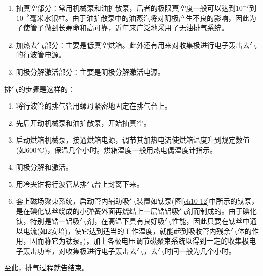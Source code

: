 \begin{enumerate}[(1)]
	\item 抽真空部分：常用机械泵和油扩散泵，后者的极限真空度一般可以达到$ 10^{-7} $到$ 10^{-8} $毫米水银柱。由于油扩散泵中的油蒸汽将对阴极产生不良的影响，因此为了使管子做到长寿命和高可靠，近年来广泛地采用了无油排气系统。
	\item 加热去气部分：主要是低真空烘箱。此外还有用来对收集极进行电子轰击去气的行波管电源。
	\item 阴极分解激活部分：主要是阴极分解激活电源。
\end{enumerate}

排气的步骤是这样的：

\begin{enumerate}
	\item 将行波管的排气管用螺母紧密地固定在排气台上。
	\item 先后开动机械泵和油扩散泵，开始抽真空。
	\item 启动烘箱机械泵，接通烘箱电源，调节其加热电流使烘箱温度升到规定数值(如600\si{\degreeCelsius})，保温几个小时。烘箱温度一般用热电偶温度计指示。
	\item 阴极分解和激活。
	\item 用冷夹钳将行波管从排气台上封离下来。
	\item 套上磁场聚束系统，启动管内辅助吸气装置如钛泵(图\ref{ch10-12}中所示的钛泵，是在碘化钛丝绕成的小弹簧外面再烧结上一层锆铝吸气剂而制成的。由于碘化钛，特别是锆一铝吸气剂，在高温下具有良好吸气性能，因此只要在钛丝中通以电流(如2安培)，使它达到适当的工作温度，就能起到吸收管内残余气体的作用，因而称它为钛泵。)，加上各极电压调节磁聚束系统以得到一定的收集极电子轰击功率，对收集极进行电子轰击去气，去气时间一般为几个小时。
\end{enumerate}

至此，排气过程就告结束。
